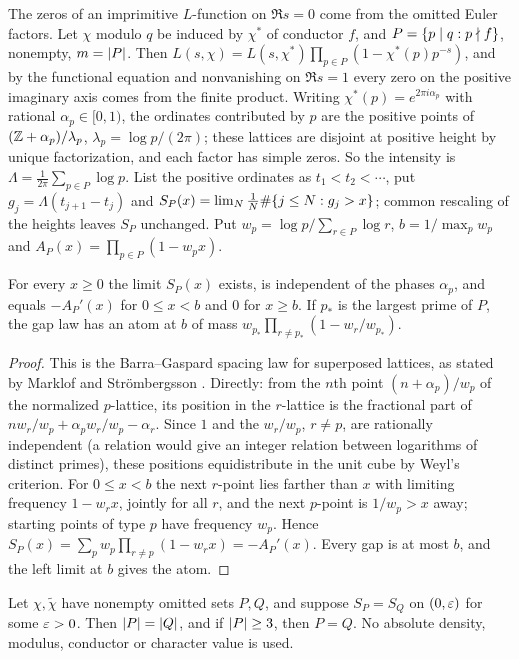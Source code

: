 The zeros of an imprimitive $L$-function on $\Re s=0$ come from the omitted Euler factors. Let
$\chi$ modulo $q$ be induced by $\chi^*$ of conductor $f$, and $P=\{p\mid q:p\nmid f\}$, nonempty,
$m=\lvert P\rvert$. Then $L(s,\chi)=L(s,\chi^*)\prod_{p\in P}(1-\chi^*(p)p^{-s})$, and by the functional
equation and nonvanishing on $\Re s=1$ every zero on the positive imaginary axis comes from the
finite product. Writing $\chi^*(p)=e^{2\pi i\alpha_p}$ with rational $\alpha_p\in[0,1)$, the
ordinates contributed by $p$ are the positive points of $(\mathbb{Z}+\alpha_p)/\lambda_p$,
$\lambda_p=\log p/(2\pi)$; these lattices are disjoint at positive height by unique factorization,
and each factor has simple zeros. So the intensity is $\Lambda=\frac1{2\pi}\sum_{p\in P}\log p$.
List the positive ordinates as $t_1<t_2<\cdots$, put $g_j=\Lambda(t_{j+1}-t_j)$ and
$S_P(x)=\lim_N\frac1N\#\{j\le N:g_j>x\}$; common rescaling of the heights leaves $S_P$ unchanged.
Put $w_p=\log p/\sum_{r\in P}\log r$, $b=1/\max_pw_p$ and $A_P(x)=\prod_{p\in P}(1-w_px)$.

\begin{proposition}\label{rec:prop:gaplaw}
For every $x\ge0$ the limit $S_P(x)$ exists, is independent of the phases $\alpha_p$, and equals
$-A_P'(x)$ for $0\le x<b$ and $0$ for $x\ge b$. If $p_*$ is the largest prime of $P$, the gap law has
an atom at $b$ of mass $w_{p_*}\prod_{r\ne p_*}(1-w_r/w_{p_*})$.
\end{proposition}

\begin{proof}
This is the Barra--Gaspard spacing law for superposed lattices, as stated by Marklof and
Str\"ombergsson \cite{MarklofStrombergsson2013Gaps}. Directly: from the $n$th point
$(n+\alpha_p)/w_p$ of the normalized $p$-lattice, its position in the $r$-lattice is the fractional
part of $nw_r/w_p+\alpha_pw_r/w_p-\alpha_r$. Since $1$ and the $w_r/w_p$, $r\ne p$, are rationally
independent (a relation would give an integer relation between logarithms of distinct primes),
these positions equidistribute in the unit cube by Weyl's criterion. For $0\le x<b$ the next
$r$-point lies farther than $x$ with limiting frequency $1-w_rx$, jointly for all $r$, and the next
$p$-point is $1/w_p>x$ away; starting points of type $p$ have frequency $w_p$. Hence
$S_P(x)=\sum_pw_p\prod_{r\ne p}(1-w_rx)=-A_P'(x)$. Every gap is at most $b$, and the left limit at $b$
gives the atom.
\end{proof}

\begin{theorem}\label{rec:thm:gaps}
Let $\chi,\widetilde\chi$ have nonempty omitted sets $P,Q$, and suppose $S_P=S_Q$ on $(0,\varepsilon)$ for
some $\varepsilon>0$. Then $\lvert P\rvert=\lvert Q\rvert$, and if $\lvert P\rvert\ge3$, then $P=Q$. No absolute density, modulus,
conductor or character value is used.
\end{theorem}

